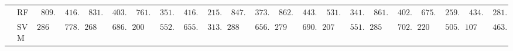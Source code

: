 \begin{tabular}{p{0.2cm}p{1cm}|p{0.6cm}p{0.6cm}|p{0.6cm}p{0.6cm}p{0.6cm}p{0.6cm}p{0.6cm}p{0.6cm}|p{0.6cm}p{0.6cm}p{0.6cm}p{0.6cm}p{0.6cm}p{0.6cm}|p{0.6cm}p{0.6cm}p{0.6cm}p{0.6cm}p{0.6cm}p{0.6cm}}
 & RF  & $\phantom{0}809.42$ & $\phantom{0}416.37$ & $\phantom{0}831.30$ & $\phantom{0}403.60$ & $\phantom{0}761.70$ & $\phantom{0}351.66$ & $\phantom{0}416.91$ & $\phantom{0}215.47$ & $\phantom{0}847.79$ & $\phantom{0}373.15$ & $\phantom{0}862.26$ & $\phantom{0}443.68$ & $\phantom{0}531.37$ & $\phantom{0}341.56$ & $\phantom{0}861.58$ & $\phantom{0}402.62$ & $\phantom{0}675.13$ & $\phantom{0}259.25$ & $\phantom{0}434.23$ & $\phantom{0}281.80$ \\
 & SVM  & $2864.89$ & $\phantom{0}778.83$ & $2680.94$ & $\phantom{0}686.57$ & $2006.52$ & $\phantom{0}552.21$ & $\phantom{0}655.75$ & $\phantom{0}313.31$ & $2888.23$ & $\phantom{0}656.91$ & $2796.43$ & $\phantom{0}690.69$ & $2071.19$ & $\phantom{0}551.93$ & $2854.65$ & $\phantom{0}702.23$ & $2204.90$ & $\phantom{0}505.10$ & $1079.35$ & $\phantom{0}463.73$ \\
\hline 
\end{tabular}

